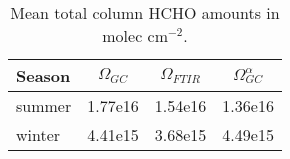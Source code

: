     \begin{table}\begin{threeparttable}
      \caption{Mean total column HCHO amounts in molec cm$^{-2}$.}
      \begin{tabular}{ l | c c c } 
        \toprule
        Season & $\Omega_{GC}$ & $\Omega_{FTIR}$ & $\Omega_{GC}^{\alpha}$  \\
        \midrule
        summer & 1.77e16 & 1.54e16 & 1.36e16 \\
        winter & 4.41e15 & 3.68e15 & 4.49e15 \\
        \bottomrule
      \end{tabular}
      \label{BioIsop:results:measurements:tab_uncertainties}
    \end{threeparttable}\end{table}
      
    

    
  
  

